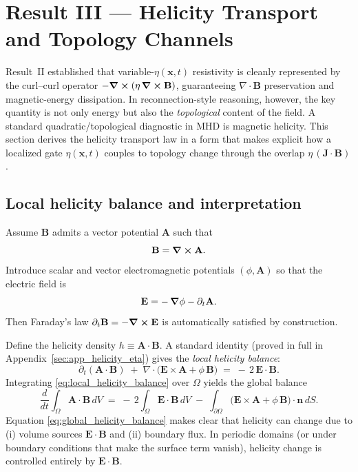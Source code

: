 \documentclass[11pt]{article}
\theoremstyle{plain}
\theoremstyle{definition}
\theoremstyle{remark}
\newcommand{\diver}{\nabla\cdot}
\newcommand{\A}{\mathbf{A}}
\newcommand{\B}{\mathbf{B}}
\newcommand{\E}{\mathbf{E}}
\newcommand{\J}{\mathbf{J}}
\begin{document}
\section{Result III --- Helicity Transport and Topology Channels}\label{sec:result_helicity}

Result~II established that variable-$\eta(\mathbf{x},t)$ resistivity is cleanly represented by the
curl--curl operator $-\curl(\eta\,\curl\B)$, guaranteeing $\diver\B$ preservation and magnetic-energy
dissipation. In reconnection-style reasoning, however, the key quantity is not only energy but also the
\emph{topological} content of the field. A standard quadratic/topological diagnostic in MHD is magnetic
helicity. This section derives the helicity transport law in a form that makes explicit how a localized
gate $\eta(\mathbf{x},t)$ couples to topology change through the overlap $\eta\,(\J\cdot\B)$.

\subsection{Local helicity balance and interpretation}\label{sec:result_helicity_local}
Assume $\B$ admits a vector potential $\A$ such that
\begin{equation}\label{eq:B_curlA_R3}
  \B = \curl\A.
\end{equation}
Introduce scalar and vector electromagnetic potentials $(\phi,\A)$ so that the electric field is
\begin{equation}\label{eq:E_potentials_R3}
  \E = -\,\grad\phi - \partial_t\A.
\end{equation}
Then Faraday's law $\partial_t\B=-\curl\E$ is automatically satisfied by construction.

Define the helicity density $h\equiv \A\cdot\B$. A standard identity (proved in full in
Appendix~\ref{sec:app_helicity_eta}) gives the \emph{local helicity balance}:
\begin{equation}\label{eq:local_helicity_balance}
  \partial_t(\A\cdot\B)
  \;+\;
  \diver\!\Big(\E\times\A + \phi\,\B\Big)
  \;=\;
  -\,2\,\E\cdot\B.
\end{equation}
Integrating \eqref{eq:local_helicity_balance} over $\Omega$ yields the global balance
\begin{equation}\label{eq:global_helicity_balance}
  \frac{d}{dt}\int_{\Omega}\A\cdot\B\,dV
  \;=\;
  -\,2\int_{\Omega}\E\cdot\B\,dV
  \;-\;
  \int_{\partial\Omega}\Big(\E\times\A + \phi\,\B\Big)\cdot\mathbf{n}\,dS.
\end{equation}
Equation \eqref{eq:global_helicity_balance} makes clear that helicity can change due to (i) volume
sources $\E\cdot\B$ and (ii) boundary flux. In periodic domains (or under boundary conditions that make
the surface term vanish), helicity change is controlled entirely by $\E\cdot\B$.
\end{document}
